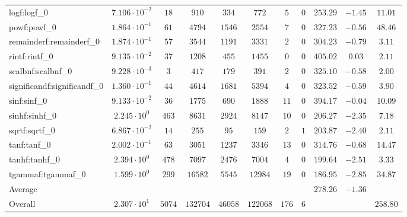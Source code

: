 \begin{tabular}{|l|c|c|c|c|c|c|c|c|c|c|}
logf:logf\_0                 & $ 7.106 \cdot 10^{-2} $ & $ 18     $ & $ 910    $ & $ 334   $ & $ 772    $ & $ 5   $ & $ 0 $ & $ 253.29      $ & $ -1.45   $ & $ 11.01   $ \\
powf:powf\_0                 & $ 1.864 \cdot 10^{-1} $ & $ 61     $ & $ 4794   $ & $ 1546  $ & $ 2554   $ & $ 7   $ & $ 0 $ & $ 327.23      $ & $ -0.56   $ & $ 48.46   $ \\
remainderf:remainderf\_0     & $ 1.874 \cdot 10^{-1} $ & $ 57     $ & $ 3544   $ & $ 1191  $ & $ 3331   $ & $ 2   $ & $ 0 $ & $ 304.23      $ & $ -0.79   $ & $ 3.11    $ \\
rintf:rintf\_0               & $ 9.135 \cdot 10^{-2} $ & $ 37     $ & $ 1208   $ & $ 455   $ & $ 1455   $ & $ 0   $ & $ 0 $ & $ 405.02      $ & $ 0.03    $ & $ 2.11    $ \\
scalbnf:scalbnf\_0           & $ 9.228 \cdot 10^{-3} $ & $ 3      $ & $ 417    $ & $ 179   $ & $ 391    $ & $ 2   $ & $ 0 $ & $ 325.10      $ & $ -0.58   $ & $ 2.00    $ \\
significandf:significandf\_0 & $ 1.360 \cdot 10^{-1} $ & $ 44     $ & $ 4614   $ & $ 1681  $ & $ 5394   $ & $ 4   $ & $ 0 $ & $ 323.52      $ & $ -0.59   $ & $ 3.90    $ \\
sinf:sinf\_0                 & $ 9.133 \cdot 10^{-2} $ & $ 36     $ & $ 1775   $ & $ 690   $ & $ 1888   $ & $ 11  $ & $ 0 $ & $ 394.17      $ & $ -0.04   $ & $ 10.09   $ \\
sinhf:sinhf\_0               & $ 2.245 \cdot 10^{0}  $ & $ 463    $ & $ 8631   $ & $ 2924  $ & $ 8147   $ & $ 10  $ & $ 0 $ & $ 206.27      $ & $ -2.35   $ & $ 7.18    $ \\
sqrtf:sqrtf\_0               & $ 6.867 \cdot 10^{-2} $ & $ 14     $ & $ 255    $ & $ 95    $ & $ 159    $ & $ 2   $ & $ 1 $ & $ 203.87      $ & $ -2.40   $ & $ 2.11    $ \\
tanf:tanf\_0                 & $ 2.002 \cdot 10^{-1} $ & $ 63     $ & $ 3051   $ & $ 1237  $ & $ 3346   $ & $ 13  $ & $ 0 $ & $ 314.76      $ & $ -0.68   $ & $ 14.47   $ \\
tanhf:tanhf\_0               & $ 2.394 \cdot 10^{0}  $ & $ 478    $ & $ 7097   $ & $ 2476  $ & $ 7004   $ & $ 4   $ & $ 0 $ & $ 199.64      $ & $ -2.51   $ & $ 3.33    $ \\
tgammaf:tgammaf\_0           & $ 1.599 \cdot 10^{0}  $ & $ 299    $ & $ 16582  $ & $ 5545  $ & $ 12984  $ & $ 19  $ & $ 0 $ & $ 186.95      $ & $ -2.85   $ & $ 34.87   $ \\
\hline
Average                      & $                     $ & $        $ & $        $ & $       $ & $        $ & $     $ & $   $ & $ 278.26      $ & $ -1.36   $ & $         $ \\
\hline
Overall                      & $ 2.307 \cdot 10^{1}  $ & $ 5074   $ & $ 132704 $ & $ 46058 $ & $ 122068 $ & $ 176 $ & $ 6 $ & $             $ & $         $ & $ 258.80  $ \\
\hline
\end{tabular}

